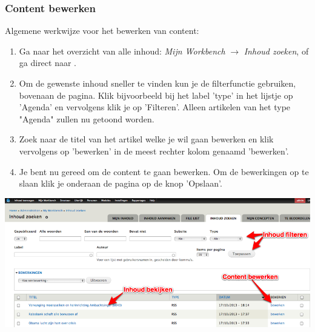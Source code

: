 \subsubsection{Content bewerken}\label{contentbewerken}
Algemene werkwijze voor het bewerken van content:
\begin{enumerate}
\item Ga naar het overzicht van alle inhoud: \emph{Mijn Workbench} $\rightarrow$ \emph{Inhoud zoeken}, of ga direct naar .
\item Om de gewenste inhoud sneller te vinden kun je de filterfunctie gebruiken, bovenaan de pagina. Klik bijvoorbeeld bij het label 'type' in het lijstje op 'Agenda' en vervolgens klik je op 'Filteren'. Alleen artikelen van het type "Agenda" zullen nu getoond worden.
\item Zoek naar de titel van het artikel welke je wil gaan bewerken en klik vervolgens op 'bewerken' in de meest rechter kolom genaamd 'bewerken'.
\item Je bent nu gereed om de content te gaan bewerken. Om de bewerkingen op te slaan klik je onderaan de pagina op de knop 'Opslaan'.
\end{enumerate}

\begin{center}
	\includegraphics[width=\textwidth]{img/content2.png}
\end{center}


